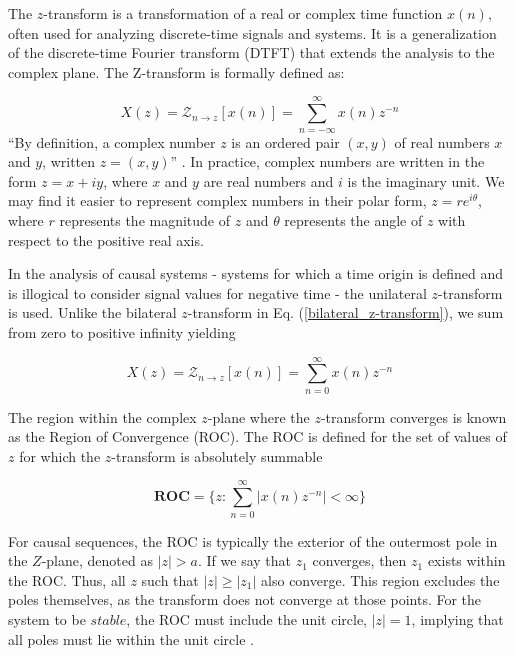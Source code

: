 \documentclass[a4paper]{report}
\begin{document}
The $z$-transform is a transformation of a real or complex time function $x(n)$, often used for analyzing discrete-time signals and systems. It is a generalization of the discrete-time Fourier transform (DTFT) that extends the analysis to the complex plane. The Z-transform is formally defined as:

\begin{equation}\label{bilateral_z-transform}
X(z) = \mathcal{Z}_{n \rightarrow z}[x(n)] = \sum^{\infty}_{n = -\infty} x(n)z^{-n}
\end{equation}
``By definition, a complex number $z$ is an ordered pair $(x, y)$ of real numbers $x$ and $y$, written $z = (x, y)$'' \citep{kreyszig2010advanced}. In practice, complex numbers are written in the form $z = x + iy$, where $x$ and $y$ are real numbers and $i$ is the imaginary unit. We may find it easier to represent complex numbers in their polar form, $z = re^{i\theta}$, where $r$ represents the magnitude of $z$ and $\theta$ represents the angle of $z$ with respect to the positive real axis.

In the analysis of causal systems - systems for which a time origin is defined and is illogical to consider signal values for negative time - the unilateral $z$-transform is used. Unlike the bilateral $z$-transform in Eq. (\ref{bilateral_z-transform}), we sum from zero to positive infinity yielding

\begin{equation}\label{unilateral_z-transform}
X(z) = \mathcal{Z}_{n \rightarrow z}[x(n)] = \sum^{\infty}_{n = 0} x(n)z^{-n}
\end{equation}

The region within the complex $z$-plane where the $z$-transform converges is known as the Region of Convergence (ROC). The ROC is defined for the set of values of $z$ for which the $z$-transform is absolutely summable

\begin{equation}\label{roc}
\textbf{ROC} = \Biggl\{ z : \sum^{\infty}_{n = 0} |x(n)z^{-n}| < \infty \Biggr\}
\end{equation}

For causal sequences, the ROC is typically the exterior of the outermost pole in the $Z$-plane, denoted as $|z| > a$. If we say that $z_1$ converges, then $z_1$ exists within the ROC. Thus, all $z$ such that $|z| \geq |z_1|$ also converge. This region excludes the poles themselves, as the transform does not converge at those points. For the system to be $stable$, the ROC must include the unit circle, $|z| = 1$, implying that all poles must lie within the unit circle \citep{LovelessGuido2021}.
\end{document}

